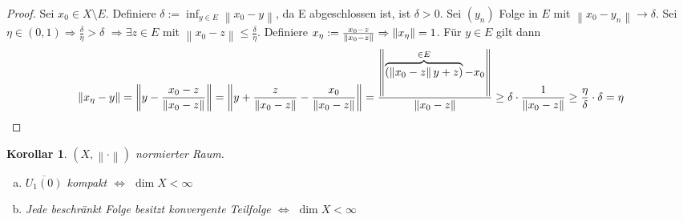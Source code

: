 \documentclass[ngerman]{report}
\theoremstyle{plain}%
\newtheorem{cor}[thm]{Korollar}
\theoremstyle{definition}%
\theoremstyle{myStyle}
\newcommand{\norm}[1]{\left \|#1\right\| }
\newcommand{\df}[1][]{%
	\overset{#1}{\Rightarrow}
}
\newcommand{\aq}{\Leftrightarrow} %
\newcommand{\spcm}[1][-0.8]{\vspace{#1 em}} %
\begin{document}
	\begin{proof}
		Sei $x_0 \in X\setminus E$. Definiere $\delta := \inf_{y\in E} \norm{x_0 - y}$, da E abgeschlossen ist, ist $\delta > 0$. Sei $(y_n)$ Folge in $E$ mit $\norm{x_0 - y_n} \to \delta$. 
Sei $\eta \in (0,1) \df \frac{\delta}{\eta} > \delta $ $\df \exists z\in E$ mit $\norm{x_0 - z} \leq \frac{\delta}{\eta}.$ Definiere $\xt := \frac{x_0-z}{\norm{x_0 - z}} \df \norm{\xt} = 1$.
		Für $y\in E$ gilt dann 
		\spcm[-1.3]
		$$\norm{\xt - y} = \norm{y - \frac{x_0-z}{\norm{x_0 - z}}} 
		= \norm{y + \frac{z}{\norm{x_0 - z}} - \frac{x_0}{\norm{x_0 - z}}} 
		= \frac{\norm{\overbrace{(\norm{x_0 - z}y + z)}^{\in E} - x_0}}{\norm{x_0 - z}}  
		\geq \delta\cdot \frac{1}{\norm{x_0 - z}} \geq \frac{\eta}{\delta} \cdot \delta = \eta$$
	\end{proof}

	

	\begin{cor}
		$(X,\norm{\cdot})$ normierter Raum.
			\begin{enumerate}[a)] 
				\item $\overline{U_1(0)}$ kompakt $\aq$ $\dim X < \infty$
				\item Jede beschränkt Folge besitzt konvergente Teilfolge $\aq$ $\dim X < \infty$
			\end{enumerate}
	\end{cor}
\end{document}
